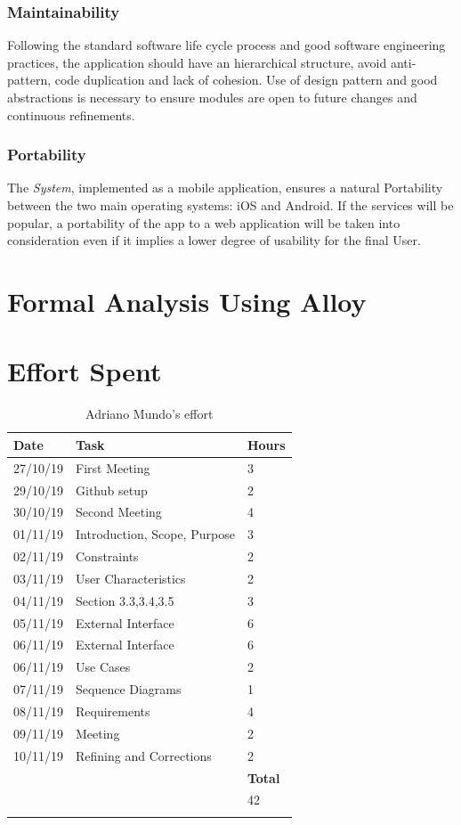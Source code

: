 \documentclass {article}
\begin{document}
	\subsubsection{Maintainability}
	Following the standard software life cycle process and good software engineering practices, the application should have an hierarchical structure, avoid anti-pattern, code duplication and lack of cohesion. Use of design pattern and good abstractions is necessary to ensure modules are open to future changes and continuous refinements. 
	\subsubsection{Portability}
	The {\it System}, implemented as a mobile application, ensures a natural Portability between the two main operating systems: iOS and Android. If the services will be popular, a portability of the app to a web application will be taken into consideration even if it implies a lower degree of usability for the final User.
	
\pagebreak


\section{Formal Analysis Using Alloy}

\section{Effort Spent}

\begin{longtable}{| p{2 cm} | p{6 cm} | p{1 cm} |} 
			\hline
			{\bf Date} & {\bf Task} & {\bf Hours}\\
			\hline
			27/10/19 & First Meeting & 3 \\
			\hline
			29/10/19 & Github setup & 2 \\
			\hline
			30/10/19 & Second Meeting & 4 \\
			\hline
			01/11/19 & Introduction, Scope, Purpose & 3 \\
			\hline
			02/11/19 & Constraints & 2 \\
			\hline
			03/11/19 & User Characteristics & 2 \\
			\hline
			04/11/19 & Section 3.3,3.4,3.5 & 3 \\
			\hline
			05/11/19 & External Interface & 6 \\
			\hline
			06/11/19 & External Interface & 6 \\
			\hline
			06/11/19 & Use Cases & 2 \\
			\hline
			07/11/19 & Sequence Diagrams  & 1 \\
			\hline
			08/11/19 & Requirements & 4 \\
			\hline
			09/11/19 & Meeting & 2 \\
			\hline
			10/11/19 & Refining and Corrections & 2 \\
			\hline
			& & {\bf Total} \\
			\hline
			& & 42 \\
			\hline
			\caption{Adriano Mundo's effort} 
\end{longtable}
\end{document}
